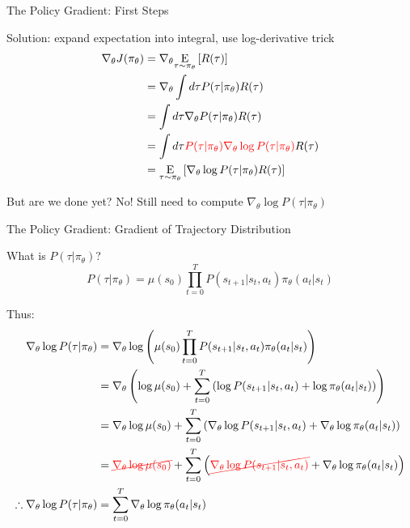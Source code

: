 \documentclass[9pt]{beamer}
\newcommand{\underE}[2]{\underset{\begin{subarray}{c}#1 \end{subarray}}{\E}\left[ #2 \right]}
\begin{document}
\begin{frame}{The Policy Gradient: First Steps}

Solution: expand expectation into integral, use log-derivative trick
%
\begin{align*}
\nabla_{\theta} J(\pi_{\theta}) &= \nabla_{\theta} \underE{\tau \sim \pi_{\theta}}{R(\tau)} \\
&= \nabla_{\theta} \int d\tau P(\tau | \pi_{\theta}) R(\tau) \\
&= \int d\tau \nabla_{\theta} P(\tau | \pi_{\theta}) R(\tau) \\
&= \int d\tau {\color{red} P(\tau | \pi_{\theta}) \nabla_{\theta} \log P(\tau | \pi_{\theta})} R(\tau) \\
&= \underE{\tau \sim \pi_{\theta}}{\nabla_{\theta} \log P(\tau | \pi_{\theta}) R(\tau) }
\end{align*}

But are we done yet? No! Still need to compute $\nabla_{\theta} \log P(\tau | \pi_{\theta})$

\end{frame}

\begin{frame}{The Policy Gradient: Gradient of Trajectory Distribution}

What is $P(\tau|\pi_{\theta})$?
%
\begin{equation*}
P(\tau | \pi_{\theta}) = \mu(s_0) \prod_{t=0}^T P(s_{t+1} | s_t, a_t) \pi_{\theta}(a_t |s_t)
\end{equation*}

Thus:
%
\begin{align*}
\nabla_{\theta} \log P(\tau|\pi_{\theta}) &= \nabla_{\theta} \log \left(\mu(s_0) \prod_{t=0}^T P(s_{t+1} | s_t, a_t) \pi_{\theta}(a_t |s_t)\right) \\
&= \nabla_{\theta} \left(\log \mu(s_0) + \sum_{t=0}^T \left(\log P(s_{t+1} | s_t, a_t) + \log \pi_{\theta}(a_t |s_t) \right)\right) \\
&= \nabla_{\theta} \log \mu(s_0) + \sum_{t=0}^T \left(\nabla_{\theta} \log P(s_{t+1} | s_t, a_t) + \nabla_{\theta} \log \pi_{\theta}(a_t |s_t) \right) \\
&= {\color{red}\cancel{\nabla_{\theta} \log \mu(s_0)}} + \sum_{t=0}^T \left({\color{red}\cancel{\nabla_{\theta} \log P(s_{t+1} | s_t, a_t)}} + \nabla_{\theta} \log \pi_{\theta}(a_t |s_t) \right) \\
\therefore \nabla_{\theta} \log P(\tau|\pi_{\theta}) &= \sum_{t=0}^T \nabla_{\theta} \log \pi_{\theta}(a_t | s_t)
\end{align*}

\end{frame}
\end{document}
